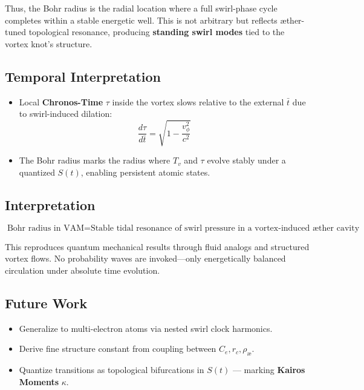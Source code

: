 \documentclass[preprint]{revtex4-2}
\begin{document}
Thus, the Bohr radius is the radial location where a full swirl-phase cycle completes within a stable energetic well. This is not arbitrary but reflects \ae ther-tuned topological resonance, producing \textbf{standing swirl modes} tied to the vortex knot's structure.

\subsection*{Temporal Interpretation}

\begin{itemize}
    \item Local \textbf{Chronos-Time} $\tau$ inside the vortex slows relative to the external $\bar{t}$ due to swirl-induced dilation:
    \[ \frac{d\tau}{d\bar{t}} = \sqrt{1 - \frac{v_\phi^2}{c^2}} \]
    \item The Bohr radius marks the radius where $T_v$ and $\tau$ evolve stably under a quantized $S(t)$, enabling persistent atomic states.
\end{itemize}

\subsection*{Interpretation}

\begin{equation}
    \boxed{
        \text{Bohr radius in VAM} =
        \text{Stable tidal resonance of swirl pressure in a vortex-induced \ae ther cavity}
    }
\end{equation}

This reproduces quantum mechanical results through fluid analogs and structured vortex flows. No probability waves are invoked---only energetically balanced circulation under absolute time evolution.

\subsection*{Future Work}

\begin{itemize}
    \item Generalize to multi-electron atoms via nested swirl clock harmonics.
    \item Derive fine structure constant from coupling between $C_e, r_c, \rho_\text{\ae}$.
    \item Quantize transitions as topological bifurcations in $S(t)$ --- marking \textbf{Kairos Moments} $\kappa$.
\end{itemize}
\end{document}
